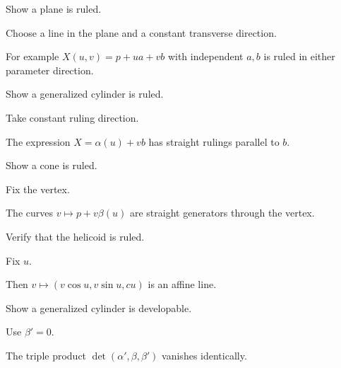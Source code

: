 \begin{exercise}\label{exr:vii18-03}
Show a plane is ruled.
\end{exercise}
\begin{hint}
Choose a line in the plane and a constant transverse direction.
\end{hint}
\begin{solution}
For example \(X(u,v)=p+ua+vb\) with independent \(a,b\) is ruled in either parameter direction.
\end{solution}

\begin{exercise}\label{exr:vii18-04}
Show a generalized cylinder is ruled.
\end{exercise}
\begin{hint}
Take constant ruling direction.
\end{hint}
\begin{solution}
The expression \(X=\alpha(u)+vb\) has straight rulings parallel to \(b\).
\end{solution}

\begin{exercise}\label{exr:vii18-05}
Show a cone is ruled.
\end{exercise}
\begin{hint}
Fix the vertex.
\end{hint}
\begin{solution}
The curves \(v\mapsto p+v\beta(u)\) are straight generators through the vertex.
\end{solution}

\begin{exercise}\label{exr:vii18-06}
Verify that the helicoid is ruled.
\end{exercise}
\begin{hint}
Fix \(u\).
\end{hint}
\begin{solution}
Then \(v\mapsto(v\cos u,v\sin u,cu)\) is an affine line.
\end{solution}

\begin{exercise}\label{exr:vii18-07}
Show a generalized cylinder is developable.
\end{exercise}
\begin{hint}
Use \(\beta'=0\).
\end{hint}
\begin{solution}
The triple product \(\det(\alpha',\beta,\beta')\) vanishes identically.
\end{solution}


